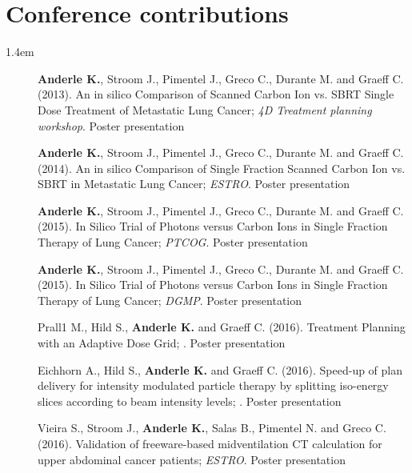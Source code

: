 \section*{Conference contributions}
\begin{setlength}{\leftmargini}{1.4em}
  \begin{description}
    \item[] \textbf{Anderle K.}, Stroom J., Pimentel J., Greco C., Durante M. and Graeff C. (2013). An in silico Comparison of Scanned Carbon Ion vs. SBRT Single Dose Treatment of Metastatic Lung Cancer; \textit{4D Treatment planning workshop}. Poster presentation
    \item[] \textbf{Anderle K.}, Stroom J., Pimentel J., Greco C., Durante M. and Graeff C. (2014). An in silico Comparison of Single Fraction Scanned Carbon Ion vs. SBRT in Metastatic Lung Cancer; \textit{ESTRO}. Poster presentation
    \item[] \textbf{Anderle K.}, Stroom J., Pimentel J., Greco C., Durante M. and Graeff C. (2015). In Silico Trial of Photons versus Carbon Ions in Single Fraction Therapy of Lung Cancer; \textit{PTCOG}. Poster presentation
    \item[] \textbf{Anderle K.}, Stroom J., Pimentel J., Greco C., Durante M. and Graeff C. (2015). In Silico Trial of Photons versus Carbon Ions in Single Fraction Therapy of Lung Cancer; \textit{DGMP}. Poster presentation
    \item[]  Prall1 M., Hild S., \textbf{Anderle K.} and Graeff C. (2016). Treatment Planning with an Adaptive Dose Grid; . Poster presentation
    \item[]  Eichhorn A., Hild S., \textbf{Anderle K.} and Graeff C. (2016). Speed-up of plan delivery for intensity modulated particle therapy by splitting iso-energy slices according to beam intensity levels; . Poster presentation
    \item[]  Vieira S., Stroom J., \textbf{Anderle K.}, Salas B., Pimentel N. and Greco C. (2016). Validation of freeware-based midventilation CT calculation for upper abdominal cancer patients; \textit{ESTRO}. Poster presentation
    
    
    
      \end{description}
\end{setlength}




% 